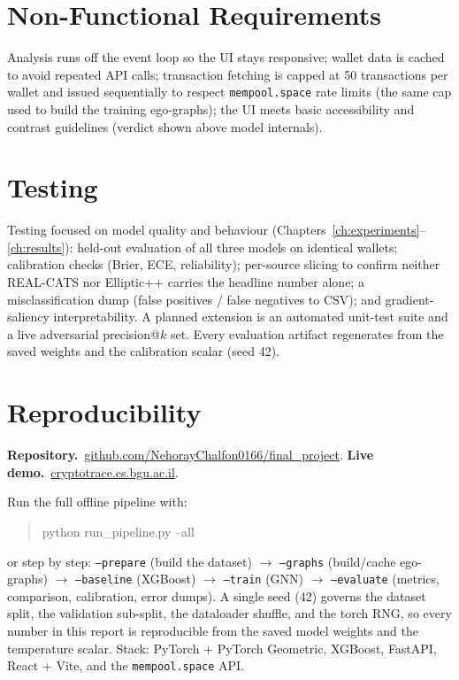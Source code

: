 \documentclass[12pt,a4paper,openany]{report}
\newcommand{\repo}{\href{https://github.com/NehorayChalfon0166/final_project}{github.com/NehorayChalfon0166/final\_project}}
\newcommand{\live}{\href{https://cryptotrace.cs.bgu.ac.il/}{cryptotrace.cs.bgu.ac.il}}
\begin{document}
\section{Non-Functional Requirements}
Analysis runs off the event loop so the UI stays responsive; wallet data is cached to avoid
repeated API calls; transaction fetching is capped at 50 transactions per wallet and issued
sequentially to respect \texttt{mempool.space} rate limits (the same cap used to build the
training ego-graphs); the UI meets basic accessibility and
contrast guidelines (verdict shown above model internals).

\section{Testing}
Testing focused on model quality and behaviour (Chapters~\ref{ch:experiments}--\ref{ch:results}):
held-out evaluation of all three models on identical wallets; calibration checks (Brier, ECE,
reliability); per-source slicing to confirm neither REAL-CATS nor Elliptic++ carries the headline
number alone; a misclassification dump (false positives / false negatives to CSV); and
gradient-saliency interpretability. A planned extension is an automated unit-test suite and a live
adversarial precision@$k$ set. Every evaluation artifact regenerates from the saved weights and
the calibration scalar (seed 42).

\section{Reproducibility}\label{app:repro}
\textbf{Repository.}~\repo. \textbf{Live demo.}~\live.

\vspace{4pt}
\noindent Run the full offline pipeline with:
\begin{quote}\ttfamily
python run\_pipeline.py --all
\end{quote}
or step by step: \texttt{--prepare} (build the dataset) $\rightarrow$ \texttt{--graphs}
(build/cache ego-graphs) $\rightarrow$ \texttt{--baseline} (XGBoost) $\rightarrow$ \texttt{--train}
(GNN) $\rightarrow$ \texttt{--evaluate} (metrics, comparison, calibration, error dumps). A single
seed (42) governs the dataset split, the validation sub-split, the dataloader shuffle, and the
torch RNG, so every number in this report is reproducible from the saved model weights and the
temperature scalar. Stack: PyTorch + PyTorch Geometric, XGBoost, FastAPI, React + Vite, and the
\texttt{mempool.space} API.
\end{document}
